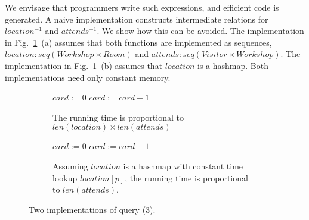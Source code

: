 \documentclass[runningheads]{llncs}
\begin{document}
We envisage that programmers write such expressions, and efficient code is generated. A naive implementation constructs intermediate relations for $location^{-1}$ and $attends^{-1}$. We show how this can be avoided. The implementation in Fig.~\ref{fig:visitorImpl}~(a) assumes that both functions are implemented as sequences, $location: seq(Workshop \times Room)$ and $attends: seq(Visitor \times Workshop)$. The implementation in Fig.~\ref{fig:visitorImpl}~(b) assumes that $location$ is a hashmap. Both implementations need only constant memory.
%
\begin{figure}[H] %
    \centering
    \begin{subfigure}[]{.47 \textwidth}
        \centering
        \begin{algorithmic}
            \State $card := 0$
                            \State $card := card + 1$
                        \EndIf
                    \EndFor
                \EndIf
            \EndFor
        \end{algorithmic}
        \caption{The running time is proportional to $len(location) \times len(attends)$}
    \end{subfigure}
    \hfill
    \begin{subfigure}[]{.48 \textwidth}
        \centering
        \begin{algorithmic}
            \State $card := 0$
                    \State $card := card + 1$
                \EndIf
            \EndFor
        \end{algorithmic}
    \caption{Assuming $location$ is a hashmap with constant time lookup $location[p]$, the running time is proportional to $len(attends)$.}
    \end{subfigure}
    \caption{Two implementations of query (3).}
    \label{fig:visitorImpl}
\end{figure}
\end{document}
